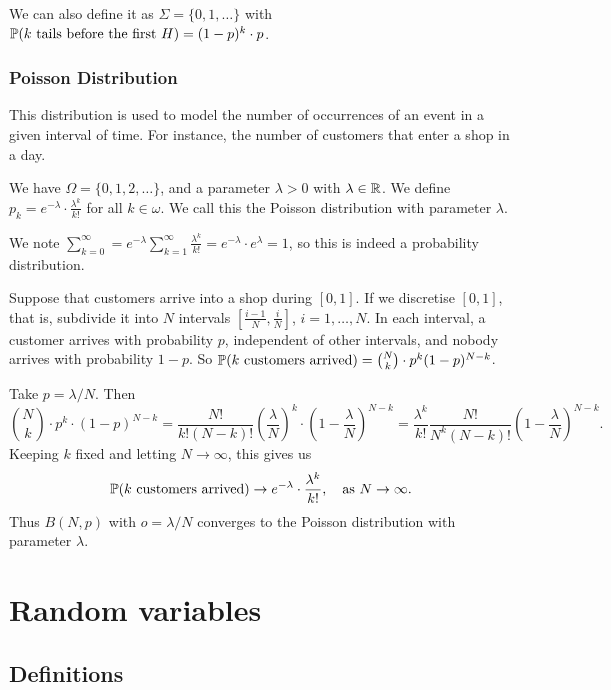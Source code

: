 \documentclass[a4paper]{scrreprt}
\begin{document}
We can also define it as $\Sigma = \{0, 1, \dots\}$ with $\mathbb{P}(\text{$k$ tails before the first $H$}) = (1 - p)^k \cdot p$.

\subsection{Poisson Distribution}

This distribution is used to model the number of occurrences of an event in a given interval of time. For instance, the number of customers that enter a shop in a day.

We have $\Omega = \{0, 1, 2, \dots \}$, and a parameter $\lambda > 0$ with $\lambda \in \mathbb{R}$. We define $p_k = e^{- \lambda} \cdot \frac{\lambda^k}{k!}$ for all $k \in \omega$. We call this the Poisson distribution with parameter $\lambda$. 

We note $\sum_{k =0}^{\infty} = e^{- \lambda} \sum_{k = 1}^{\infty} \frac{\lambda^k}{k!} = e^{-\lambda} \cdot e^{\lambda} = 1$, so this is indeed a probability distribution.

Suppose that customers arrive into a shop during $[0, 1]$. 
If we discretise $[0, 1]$, that is, subdivide it into $N$ intervals $\left[\frac{i - 1}{N}, \frac{i}{N}\right]$, $i = 1, \dots, N$.
In each interval, a customer arrives with probability $p$, independent of other intervals, and nobody arrives with probability $1 - p$.
So $\mathbb{P}(\text{$k$ customers arrived}) = \binom{N}{k} \cdot p^k(1 - p)^{N - k}$.

Take $p = \lambda/N$. Then
$$
\binom{N}{k} \cdot p^{k} \cdot (1 - p)^{N - k} = \frac{N!}{k! (N - k)!} \left(\frac{\lambda}{N}\right)^k \cdot \left(1 - \frac{\lambda}{N}\right)^{N - k} = \frac{\lambda^k}{k!} \frac{N!}{N^k(N - k)!} \left(1 - \frac{\lambda}{N}\right)^{N - k}.
$$
Keeping $k$ fixed and letting $N \rightarrow \infty$, this gives us
$$
	\mathbb{P}(\text{$k$ customers arrived}) \rightarrow e^{- \lambda} \cdot \frac{\lambda^k}{k!}, \quad \text{as } N \rightarrow \infty.
$$
Thus $B(N, p)$ with $o = \lambda/N$ converges to the Poisson distribution with parameter $\lambda$.

\chapter{Random variables}

\section{Definitions}
\end{document}
